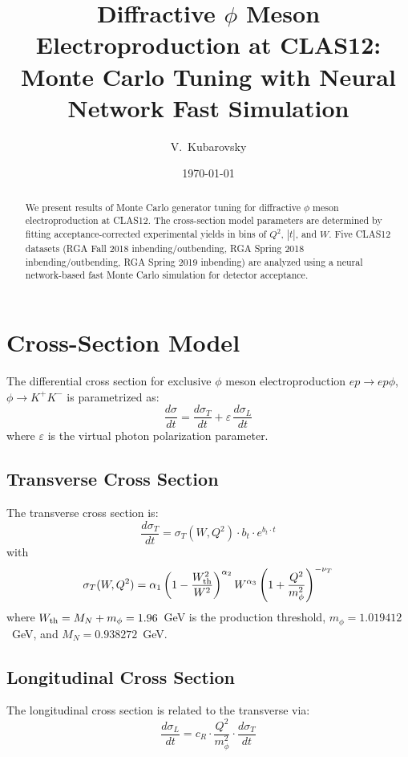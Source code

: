 \documentclass[12pt,a4paper]{article}
\title{Diffractive $\phi$ Meson Electroproduction at CLAS12:\\
Monte Carlo Tuning with Neural Network Fast Simulation}
\author{V.~Kubarovsky}
\date{\today}
\begin{document}
\maketitle

\begin{abstract}
We present results of Monte Carlo generator tuning for diffractive $\phi$ meson
electroproduction at CLAS12. The cross-section model parameters are determined
by fitting acceptance-corrected experimental yields in bins of $Q^2$, $|t|$, and $W$.
Five CLAS12 datasets (RGA Fall 2018 inbending/outbending, RGA Spring 2018
inbending/outbending, RGA Spring 2019 inbending) are analyzed using a neural
network-based fast Monte Carlo simulation for detector acceptance.
\end{abstract}

\tableofcontents
\newpage

\section{Cross-Section Model}
\label{sec:model}

The differential cross section for exclusive $\phi$ meson electroproduction
$ep \to ep\phi$, $\phi \to K^+K^-$ is parametrized as:
\begin{equation}
\frac{d\sigma}{dt} = \frac{d\sigma_T}{dt} + \varepsilon\,\frac{d\sigma_L}{dt}
\end{equation}
where $\varepsilon$ is the virtual photon polarization parameter.

\subsection{Transverse Cross Section}
The transverse cross section is:
\begin{equation}
\frac{d\sigma_T}{dt} = \sigma_T(W,Q^2) \cdot b_t \cdot e^{b_t \cdot t}
\end{equation}
with
\begin{equation}
\sigma_T(W,Q^2) = \alpha_1 \left(1 - \frac{W_{\rm th}^2}{W^2}\right)^{\alpha_2}
W^{\alpha_3} \left(1 + \frac{Q^2}{m_\phi^2}\right)^{-\nu_T}
\end{equation}
where $W_{\rm th} = M_N + m_\phi = 1.96$~GeV is the production threshold,
$m_\phi = 1.019412$~GeV, and $M_N = 0.938272$~GeV.

\subsection{Longitudinal Cross Section}
The longitudinal cross section is related to the transverse via:
\begin{equation}
\frac{d\sigma_L}{dt} = c_R \cdot \frac{Q^2}{m_\phi^2} \cdot \frac{d\sigma_T}{dt}
\end{equation}
\end{document}

